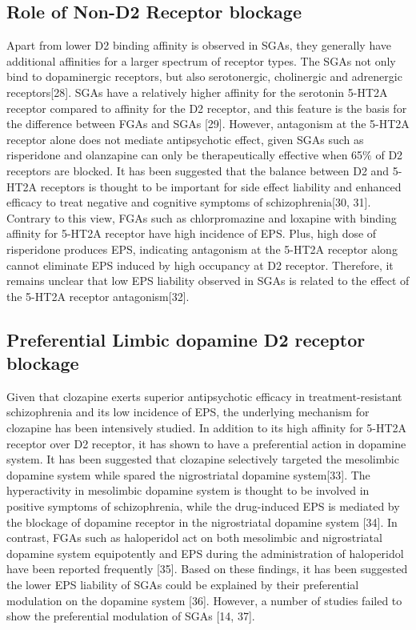\documentclass[12pt]{report}
\begin{document}
			\subsection{Role of Non-D2 Receptor blockage}
				Apart from lower D2 binding affinity is observed in SGAs, they generally have additional affinities for a larger spectrum of receptor types. 
				The SGAs not only bind to dopaminergic receptors, but also serotonergic, cholinergic and adrenergic receptors[28]. 
				SGAs have a relatively higher affinity for the serotonin 5-HT2A receptor  compared to affinity for the D2 receptor, and this feature is the basis for the difference between FGAs and SGAs [29].  
				However, antagonism at the 5-HT2A receptor alone does not mediate antipsychotic effect, given SGAs such as risperidone and olanzapine can only be therapeutically effective when 65$\%$ of D2 receptors are blocked. 
				It has been suggested that the balance between D2 and 5-HT2A receptors is thought to be important for side effect liability and enhanced efficacy to treat negative and cognitive symptoms of schizophrenia[30, 31].  
				Contrary to this view, FGAs such as chlorpromazine and loxapine with binding affinity for 5-HT2A receptor have high incidence of EPS. 
				Plus, high dose of risperidone produces EPS, indicating antagonism at the 5-HT2A receptor along cannot eliminate EPS induced by high occupancy at D2 receptor. 
				Therefore, it remains unclear that low EPS liability observed in SGAs is related to the effect of the 5-HT2A receptor antagonism[32]. 
			\subsection{Preferential Limbic dopamine D2 receptor blockage}
				Given that clozapine exerts superior antipsychotic efficacy in treatment-resistant schizophrenia and its low incidence of EPS, the underlying mechanism for clozapine has been intensively studied. 
				In addition to its high affinity for 5-HT2A receptor over D2 receptor, it has shown to have a preferential action in dopamine system. 
				It has been suggested that clozapine selectively targeted the mesolimbic dopamine system while spared the nigrostriatal dopamine system[33]. 
				The hyperactivity in mesolimbic dopamine system is thought to be involved in positive symptoms of schizophrenia, while the drug-induced EPS is mediated by the blockage of dopamine receptor in the nigrostriatal dopamine system [34]. 
				In contrast, FGAs such as haloperidol act on both mesolimbic and nigrostriatal dopamine system equipotently and EPS during the administration of  haloperidol have been reported frequently [35].
				Based on these findings, it has been suggested the lower EPS liability of SGAs could be explained by their preferential modulation on the dopamine system [36].  
				However, a number of studies failed to show the preferential modulation of SGAs [14, 37].
\end{document}

